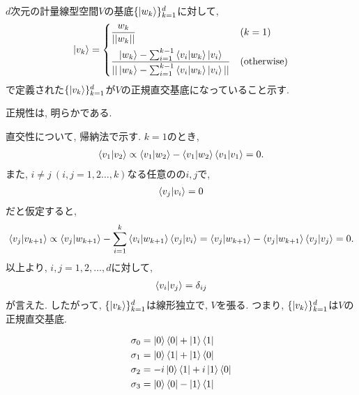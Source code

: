 \begin{ex}
    \label{ex2.8}
    $d$次元の計量線型空間$V$の基底$\{\ket{w_k}\}_{k=1}^d$に対して,
    \begin{align*}
        \ket{v_{k}}
        =
        \begin{dcases}
            \frac{w_{k}}{||w_{k}||} & (k=1)                \\
            \frac{
            \ket{w_{k}}-\sum_{i=1}^{k-1}\braket{v_i|w_{k}} \ket{v_i}
            }{
            ||\ket{w_{k}}-\sum_{i=1}^{k-1}\braket{v_i|w_{k}} \ket{v_i}||
            }                       & (\mathrm{otherwise})
        \end{dcases}
    \end{align*}
    で定義された$\{\ket{v_k}\}_{k=1}^d$が$V$の正規直交基底になっていること示す.
    \par
    正規性は, 明らかである.
    \par
    直交性について, 帰納法で示す.
    $k=1$のとき,
    \begin{align*}
        \braket{v_1|v_2}
        \propto
        \braket{v_1|w_2}- \braket{v_1|w_2} \braket{v_1|v_1} = 0.
    \end{align*}
    また, $i \neq j\ (i,j=1,2 \dots, k)$なる任意のの$i,j$で,
    \begin{align*}
        \braket{v_j|v_i} = 0
    \end{align*}
    だと仮定すると,
    \begin{align*}
        \braket{v_j|v_{k+1}}
        \propto
        \braket{v_j|w_{k+1}}-\sum_{i=1}^k\braket{v_i|w_{k+1}} \braket{v_j|v_i}
        =
        \braket{v_j|w_{k+1}}-\braket{v_j|w_{k+1}}\braket{v_j|v_j}
        =
        0.
    \end{align*}
    以上より, $i,j=1,2,\dots,d$に対して,
    \begin{align*}
        \braket{v_i|v_j} = \delta_{ij}
    \end{align*}
    が言えた. したがって, $\{\ket{v_k}\}_{k=1}^d$は線形独立で, $V$を張る. つまり, $\{\ket{v_k}\}_{k=1}^d$は$V$の正規直交基底.
\end{ex}

\begin{ex}
    \label{ex2.9}
    \begin{align*}
        \sigma_0 & = \ket{0}\bra{0} + \ket{1}\bra{1}      \\
        \sigma_1 & = \ket{0}\bra{1} + \ket{1}\bra{0}      \\
        \sigma_2 & = -i \ket{0}\bra{1} + i \ket{1}\bra{0} \\
        \sigma_3 & = \ket{0}\bra{0} - \ket{1}\bra{1}
    \end{align*}
\end{ex}


